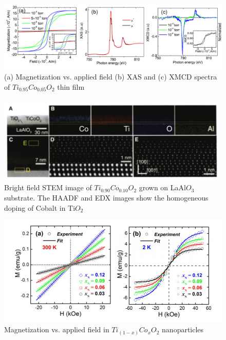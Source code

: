 \documentclass[main.tex]{subfiles}
\begin{document}
\begin{figure}[!htb]
	\centering
	\includegraphics[width=0.99\linewidth]{saadaoui}
	\caption{(a) Magnetization vs. applied field (b) XAS and (c) XMCD spectra of $Ti_{0.95}Co_{0.05}O_{2}$ thin film \cite{saadaoui2016intrinsic}}
	\label{fig:TEM_PT}
\end{figure}
\FloatBarrier

\begin{figure}[!htb]
	\centering
	\includegraphics[width=0.99\linewidth]{yamada}
	\caption{Bright field STEM image of $Ti_{0.90}Co_{0.10}O_{2}$ grown on LaAl$O_{3}$ substrate. The HAADF and EDX images show the homogeneous doping of Cobalt in Ti$O_{2}$ \cite{yamada2011electrically}}
	\label{fig:TEM_PT}
\end{figure}
\FloatBarrier

\begin{figure}[!htb]
	\centering
	\includegraphics[width=0.99\linewidth]{souza}
	\caption{Magnetization vs. applied field in $Ti_{(1-x)}Co_{x}O_{2}$ nanoparticles \cite{de2013structural}}
	\label{fig:TEM_PT}
\end{figure}
\FloatBarrier
\end{document}
